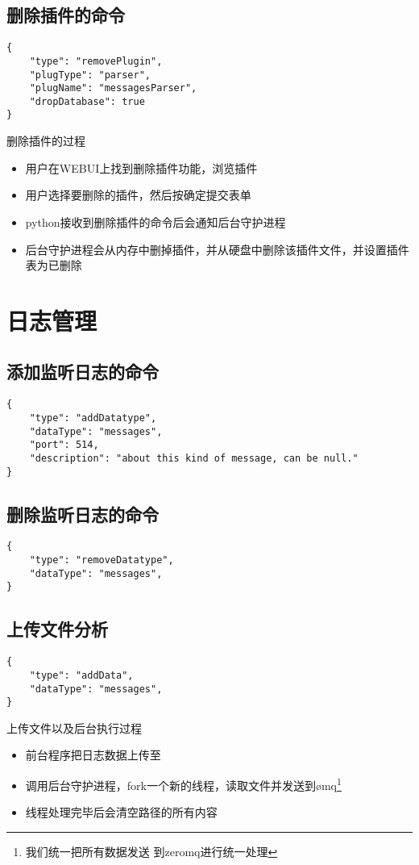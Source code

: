 \documentclass{article}
\begin{document}
\subsection{删除插件的命令}
\begin{verbatim}
{
    "type": "removePlugin",
    "plugType": "parser",
    "plugName": "messagesParser",
    "dropDatabase": true
}
\end{verbatim}
\textsf{删除插件的过程}
\begin{itemize}
\item[(1)] 用户在WEBUI上找到删除插件功能，浏览插件
\item[(2)] 用户选择要删除的插件，然后按确定提交表单
\item[(3)] python接收到删除插件的命令后会通知后台守护进程
\item[(4)] 后台守护进程会从内存中删掉插件，并从硬盘中删除该插件文件，并设置插件表为已删除
\end{itemize}


\section{日志管理}
\subsection{添加监听日志的命令}
\begin{verbatim}
{
    "type": "addDatatype",
    "dataType": "messages",
    "port": 514,
    "description": "about this kind of message, can be null."
}
\end{verbatim}

\subsection{删除监听日志的命令}
\begin{verbatim}
{
    "type": "removeDatatype",
    "dataType": "messages",
}
\end{verbatim}

\subsection{上传文件分析}
\begin{verbatim}
{
    "type": "addData",
    "dataType": "messages",
}
\end{verbatim}
\textsf{上传文件以及后台执行过程}
\begin{itemize}
\item[(1)] 前台程序把日志数据上传至
\item[(2)] 调用后台守护进程，fork一个新的线程，读取文件并发送到\o mq\footnote{我们统一把所有数据发送
到zeromq进行统一处理}
\item[(3)] 线程处理完毕后会清空路径的所有内容
\end{itemize}
\end{document}
